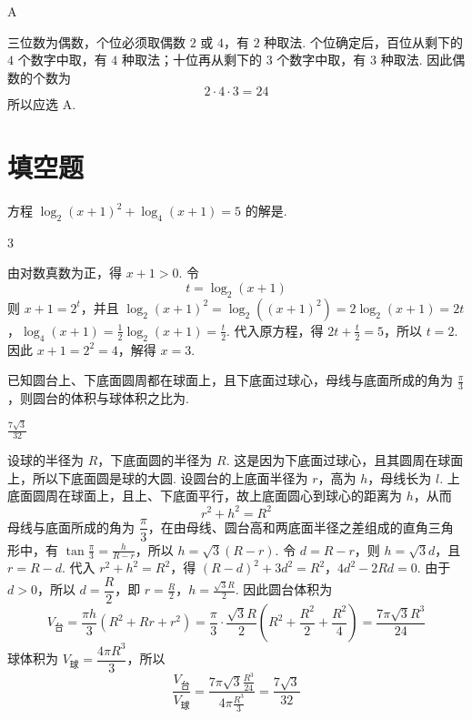 \documentclass[UTF8,a4paper,oneside,11pt]{ctexbook}
\begin{document}
\begin{answer}
A
\end{answer}

\begin{solution}
三位数为偶数，个位必须取偶数 \(2\) 或 \(4\)，有 \(2\) 种取法. 个位确定后，百位从剩下的 \(4\) 个数字中取，有 \(4\) 种取法；十位再从剩下的 \(3\) 个数字中取，有 \(3\) 种取法. 因此偶数的个数为
\[
2\cdot4\cdot3=24
\]
所以应选 A.
\end{solution}

\section{填空题}

\begin{problem}
方程 \(\log_2(x + 1)^2 + \log_4(x + 1) = 5\) 的解是\fillinblank{}.
\end{problem}

\begin{answer}
\(3\)
\end{answer}

\begin{solution}
由对数真数为正，得 \(x+1>0\). 令
\[
t=\log_2(x+1)
\]
则 \(x+1=2^t\)，并且 \(\log_2(x+1)^2=\log_2\left((x+1)^2\right)=2\log_2(x+1)=2t\)，\(\log_4(x+1)=\frac12\log_2(x+1)=\frac t2\).
代入原方程，得 \(2t+\frac t2=5\)，所以 \(t=2\).
因此 \(x+1=2^2=4\)，解得 \(x=3\).
\end{solution}

\begin{problem}
已知圆台上、下底面圆周都在球面上，且下底面过球心，母线与底面所成的角为 \(\frac{\pi}{3}\)，则圆台的体积与球体积之比为\fillinblank{}.
\end{problem}

\begin{answer}
\(\frac{7\sqrt{3}}{32}\)
\end{answer}

\begin{solution}
设球的半径为 \(R\)，下底面圆的半径为 \(R\). 这是因为下底面过球心，且其圆周在球面上，所以下底面圆是球的大圆. 设圆台的上底面半径为 \(r\)，高为 \(h\)，母线长为 \(l\). 上底面圆周在球面上，且上、下底面平行，故上底面圆心到球心的距离为 \(h\)，从而
\[
r^2+h^2=R^2
\]
母线与底面所成的角为 \(\dfrac{\pi}{3}\)，在由母线、圆台高和两底面半径之差组成的直角三角形中，有 \(\tan\frac{\pi}{3}=\frac{h}{R-r}\)，所以 \(h=\sqrt3(R-r)\).
令 \(d=R-r\)，则 \(h=\sqrt3d\)，且 \(r=R-d\). 代入 \(r^2+h^2=R^2\)，得
\((R-d)^2+3d^2=R^2\)，\(4d^2-2Rd=0\).
由于 \(d>0\)，所以 \(d=\dfrac R2\)，即 \(r=\frac R2\)，\(h=\frac{\sqrt3 R}{2}\).
因此圆台体积为
\[
V_{\text{台}}=\frac{\pi h}{3}\left(R^2+Rr+r^2\right)
=\frac{\pi}{3}\cdot\frac{\sqrt3 R}{2}
\left(R^2+\frac{R^2}{2}+\frac{R^2}{4}\right)
=\frac{7\pi\sqrt3 R^3}{24}
\]
球体积为 \(V_{\text{球}}=\dfrac{4\pi R^3}{3}\)，所以
\[
\frac{V_{\text{台}}}{V_{\text{球}}}
=\frac{7\pi\sqrt3 \frac{R^3}{24}}{4\pi \frac{R^3}{3}}
=\frac{7\sqrt3}{32}
\]
\end{solution}
\end{document}
